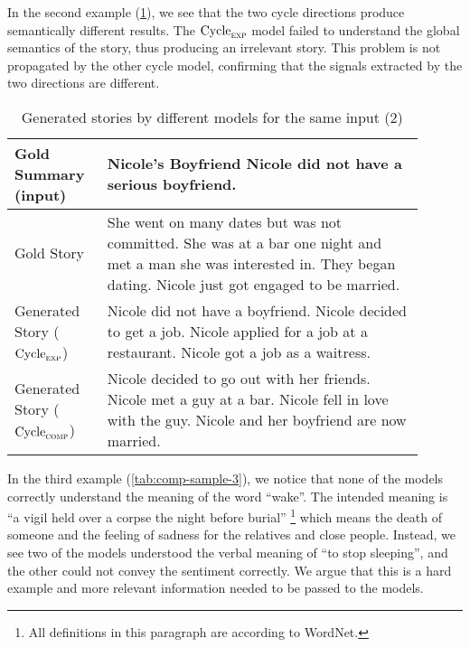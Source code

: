 In the second example (\cref{tab:comp-sample-2}), we see that the two cycle directions produce semantically different results. The $\text{Cycle}_{\textsc{exp}}$ model failed to understand the global semantics of the story, thus producing an irrelevant story. This problem is not propagated by the other cycle model, confirming that the signals extracted by the two directions are different.

\begin{table}[h]
\centering
\begin{tabular}{p{0.2\linewidth} | p{0.7\linewidth}}
Gold Summary (input)  & Nicole's Boyfriend Nicole did not have a serious boyfriend. \\ \hline
Gold Story & She went on many dates but was not committed. She was at a bar one night and met a man she was interested in. They began dating. Nicole just got engaged to be married. \\ \hline
Generated Story ($\text{Cycle}_{\textsc{exp}}$) & Nicole did not have a boyfriend. Nicole decided to get a job. Nicole applied for a job at a restaurant. Nicole got a job as a waitress. \\ \hline
Generated Story ($\text{Cycle}_{\textsc{comp}}$) & Nicole decided to go out with her friends. Nicole met a guy at a bar. Nicole fell in love with the guy. Nicole and her boyfriend are now married.
\end{tabular}
\caption{Generated stories by different models for the same input (2)}
\label{tab:comp-sample-2}
\end{table}

In the third example (\cref{tab:comp-sample-3}), we notice that none of the models correctly understand the meaning of the word ``wake''. The intended meaning is ``a vigil held over a corpse the night before burial'' \footnote{All definitions in this paragraph are according to WordNet.} which means the death of someone and the feeling of sadness for the relatives and close people. Instead, we see two of the models understood the verbal meaning of ``to stop sleeping'', and the other could not convey the sentiment correctly. We argue that this is a hard example and more relevant information needed to be passed to the models.


